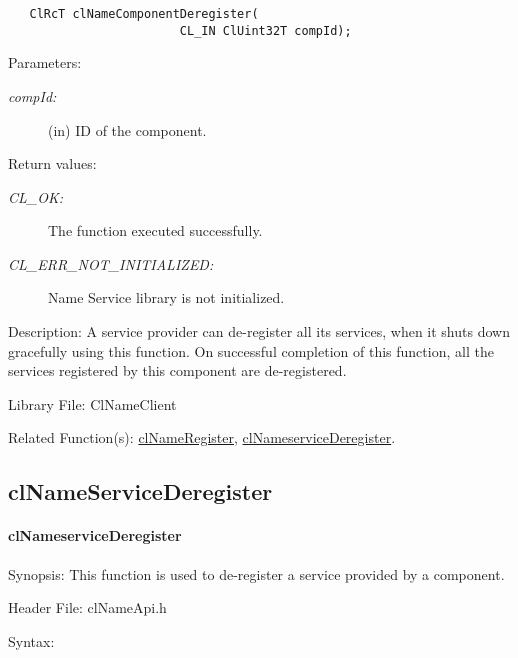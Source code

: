 \begin{flushleft}
\begin{Desc}
\footnotesize\begin{verbatim}   ClRcT clNameComponentDeregister(
						CL_IN ClUint32T compId);
\end{verbatim}
\normalsize
\end{Desc}
\begin{Desc}
\item[Parameters:]
\begin{description}
\item[{\em comp\-Id:}](in) ID of the component.\end{description}
\end{Desc}
\begin{Desc}
\item[Return values:]
\begin{description}
\item[{\em CL\_\-OK:}]The function executed successfully. 
\item[{\em CL\_\-ERR\_\-NOT\_\-INITIALIZED:}]Name Service library is not initialized.\end{description}
\end{Desc}
\begin{Desc}
\item[Description:]A service provider can de-register all its services, when it shuts down gracefully using this function. On successful completion of this
function, all the services registered by this component are de-registered. 
\end{Desc}
\begin{Desc}
\item[Library File:]Cl\-Name\-Client\end{Desc}
\begin{Desc}
\item[Related Function(s):]\hyperlink{pagens103}{cl\-Name\-Register}, \hyperlink{pagens105}{cl\-Name\-service\-Deregister}. \end{Desc}
\newpage


\subsection{clNameServiceDeregister}
\hypertarget{pagens105}{}\paragraph{cl\-Name\-service\-Deregister}\label{pagens105}
\begin{Desc}
\item[Synopsis:]This function is used to de-register a service provided by a component.\end{Desc}
\begin{Desc}
\item[Header File:]clNameApi.h\end{Desc}
\begin{Desc}
\item[Syntax:]


\end{Desc}
\end{flushleft}
